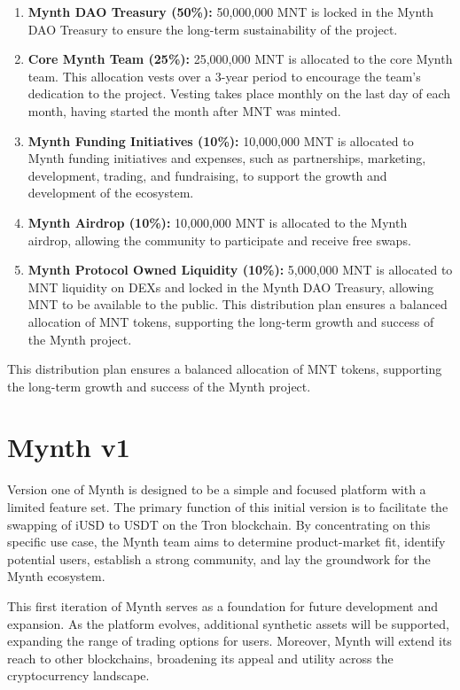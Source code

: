 \begin{enumerate}
\item
  \textbf{Mynth DAO Treasury (50\%):} 50,000,000 MNT is locked in the
  Mynth DAO Treasury to ensure the long-term sustainability of the
  project.
\item
  \textbf{Core Mynth Team (25\%):} 25,000,000 MNT is allocated to the
  core Mynth team. This allocation vests over a 3-year period to
  encourage the team's dedication to the project. Vesting takes place
  monthly on the last day of each month, having started the month after
  MNT was minted.
\item
  \textbf{Mynth Funding Initiatives (10\%):} 10,000,000 MNT is allocated
  to Mynth funding initiatives and expenses, such as partnerships,
  marketing, development, trading, and fundraising, to support the
  growth and development of the ecosystem.
\item
  \textbf{Mynth Airdrop (10\%):} 10,000,000 MNT is allocated to the
  Mynth airdrop, allowing the community to participate and receive free
  swaps.
\item
  \textbf{Mynth Protocol Owned Liquidity (10\%):} 5,000,000 MNT is
  allocated to MNT liquidity on DEXs and locked in the Mynth DAO
  Treasury, allowing MNT to be available to the public. This
  distribution plan ensures a balanced allocation of MNT tokens,
  supporting the long-term growth and success of the Mynth project.
\end{enumerate}

This distribution plan ensures a balanced allocation of MNT tokens,
supporting the long-term growth and success of the Mynth project.

\hypertarget{mynth-v1}{%
\section{Mynth v1}\label{mynth-v1}}

Version one of Mynth is designed to be a simple and focused platform
with a limited feature set. The primary function of this initial version
is to facilitate the swapping of iUSD to USDT on the Tron blockchain. By
concentrating on this specific use case, the Mynth team aims to
determine product-market fit, identify potential users, establish a
strong community, and lay the groundwork for the Mynth ecosystem.

This first iteration of Mynth serves as a foundation for future
development and expansion. As the platform evolves, additional synthetic
assets will be supported, expanding the range of trading options for
users. Moreover, Mynth will extend its reach to other blockchains,
broadening its appeal and utility across the cryptocurrency landscape.

